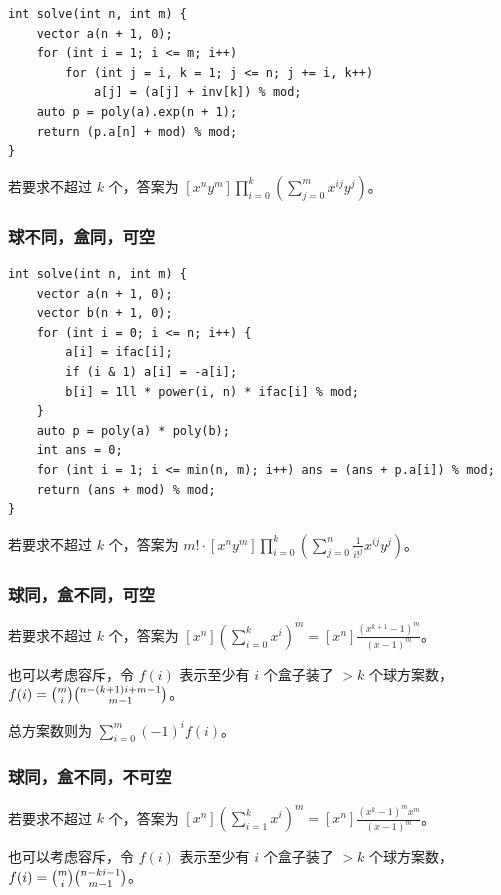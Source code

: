 \documentclass[UTF8]{ctexart}
\begin{document}
\begin{sloppypar}
\begin{lstlisting}[style=cpp]
int solve(int n, int m) {
    vector a(n + 1, 0);
    for (int i = 1; i <= m; i++)
        for (int j = i, k = 1; j <= n; j += i, k++)
            a[j] = (a[j] + inv[k]) % mod;
    auto p = poly(a).exp(n + 1);
    return (p.a[n] + mod) % mod;
}
\end{lstlisting}

若要求不超过  $k$ 个，答案为 $[x^ny^m]\prod\limits_{i=0}^k \left(\sum\limits_{j=0}^m x^{ij}y^j\right)$。

\subsubsection{球不同，盒同，可空}

\begin{lstlisting}[style=cpp]
int solve(int n, int m) {
    vector a(n + 1, 0);
    vector b(n + 1, 0);
    for (int i = 0; i <= n; i++) {
        a[i] = ifac[i];
        if (i & 1) a[i] = -a[i];
        b[i] = 1ll * power(i, n) * ifac[i] % mod;
    }
    auto p = poly(a) * poly(b);
    int ans = 0;
    for (int i = 1; i <= min(n, m); i++) ans = (ans + p.a[i]) % mod;
    return (ans + mod) % mod;
}
\end{lstlisting}

若要求不超过  $k$ 个，答案为 $m! \cdot [x^ny^m]\prod\limits_{i=0}^k \left(\sum\limits_{j=0}^n\frac{1}{i!^j} x^{ij}y^j\right)$。

\subsubsection{球同，盒不同，可空}

若要求不超过  $k$ 个，答案为 $[x^n]\left(\sum\limits_{i=0}^kx^i\right)^m = [x^n]\frac{(x^{k+1}-1)^m}{(x-1)^m}$。

也可以考虑容斥，令 $f(i)$ 表示至少有 $i$ 个盒子装了 $>k$ 个球方案数，$f(i) = \tbinom{m}{i}\tbinom{n-(k+1)i+m-1}{m-1}$。

总方案数则为 $\sum\limits_{i=0}^{m}(-1)^if(i)$。

\subsubsection{球同，盒不同，不可空}

若要求不超过  $k$ 个，答案为 $[x^n]\left(\sum\limits_{i=1}^kx^i\right)^m = [x^n]\frac{(x^k-1)^mx^m}{(x-1)^m}$。

也可以考虑容斥，令 $f(i)$ 表示至少有 $i$ 个盒子装了 $>k$ 个球方案数，$f(i) = \tbinom{m}{i}\tbinom{n-ki-1}{m-1}$。


\end{sloppypar}
\end{document}
